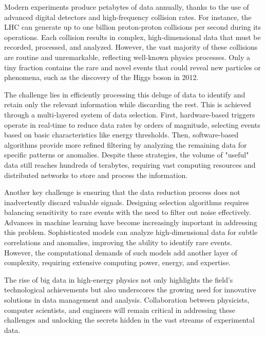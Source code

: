 \documentclass[preprint,12pt]{elsarticle}
\begin{document}
Modern experiments produce petabytes of data annually, thanks to the use of advanced digital detectors and high-frequency collision rates. For instance, the LHC can generate up to one billion proton-proton collisions per second during its operations. Each collision results in complex, high-dimensional data that must be recorded, processed, and analyzed. However, the vast majority of these collisions are routine and unremarkable, reflecting well-known physics processes. Only a tiny fraction contains the rare and novel events that could reveal new particles or phenomena, such as the discovery of the Higgs boson in 2012.

The challenge lies in efficiently processing this deluge of data to identify and retain only the relevant information while discarding the rest. This is achieved through a multi-layered system of data selection. First, hardware-based triggers operate in real-time to reduce data rates by orders of magnitude, selecting events based on basic characteristics like energy thresholds. Then, software-based algorithms provide more refined filtering by analyzing the remaining data for specific patterns or anomalies. Despite these strategies, the volume of "useful" data still reaches hundreds of terabytes, requiring vast computing resources and distributed networks to store and process the information.

Another key challenge is ensuring that the data reduction process does not inadvertently discard valuable signals. Designing selection algorithms requires balancing sensitivity to rare events with the need to filter out noise effectively. Advances in machine learning have become increasingly important in addressing this problem. Sophisticated models can analyze high-dimensional data for subtle correlations and anomalies, improving the ability to identify rare events. However, the computational demands of such models add another layer of complexity, requiring extensive computing power, energy, and expertise.

The rise of big data in high-energy physics not only highlights the field’s technological achievements but also underscores the growing need for innovative solutions in data management and analysis. Collaboration between physicists, computer scientists, and engineers will remain critical in addressing these challenges and unlocking the secrets hidden in the vast streams of experimental data.
\end{document}
